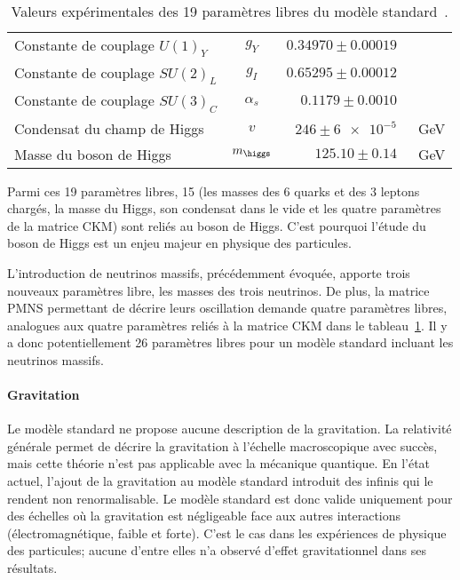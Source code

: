 \begin{table}[h]
\begin{tabular}{lcrl}
Constante de couplage $U(1)_Y$ & $g_Y$ & $\num{0.34970}\pm\num{0.00019}$ & \\
Constante de couplage $SU(2)_L$ & $g_I$ & $\num{0.65295}\pm\num{0.00012}$ & \\
Constante de couplage $SU(3)_C$ & $\alpha_s$ & $\num{0.1179}\pm\num{0.0010}$ & \\
Condensat du champ de Higgs & $v$ & $\num{246}\pm\num{6e-5}$ & \SI{}{\GeV} \\
Masse du boson de Higgs & $m_{\higgs}$ & $\num{125.10}\pm\num{0.14}$ & \SI{}{\GeV} \\
\bottomrule
\end{tabular}
\caption[Valeurs expérimentales des 19 paramètres libres du modèle standard.]{Valeurs expérimentales des 19 paramètres libres du modèle standard~\cite{PDG_booklet_2020}.}
\label{tab-19_free_SM_parameters}
\end{table}
Parmi ces 19 paramètres libres, 15 (les masses des 6 quarks et des 3 leptons chargés, la masse du Higgs, son condensat dans le vide et les quatre paramètres de la matrice CKM) sont reliés au boson de Higgs. C'est pourquoi l'étude du boson de Higgs est un enjeu majeur en physique des particules.
\par L'introduction de neutrinos massifs, précédemment évoquée, apporte trois nouveaux paramètres libre, les masses des trois neutrinos. De plus, la matrice PMNS permettant de décrire leurs oscillation demande quatre paramètres libres, analogues aux quatre paramètres reliés à la matrice CKM dans le tableau~\ref{tab-19_free_SM_parameters}. Il y a donc potentiellement 26 paramètres libres pour un modèle standard incluant les neutrinos massifs.
\paragraph{Gravitation}
Le modèle standard ne propose aucune description de la gravitation.
La relativité générale permet de décrire la gravitation à l'échelle macroscopique avec succès, mais cette théorie n'est pas applicable avec la mécanique quantique.
En l'état actuel, l'ajout de la gravitation au modèle standard introduit des infinis qui le rendent non renormalisable.
Le modèle standard est donc valide uniquement pour des échelles où la gravitation est négligeable face aux autres interactions (électromagnétique, faible et forte).
C'est le cas dans les expériences de physique des particules; aucune d'entre elles n'a observé d'effet gravitationnel dans ses résultats.
